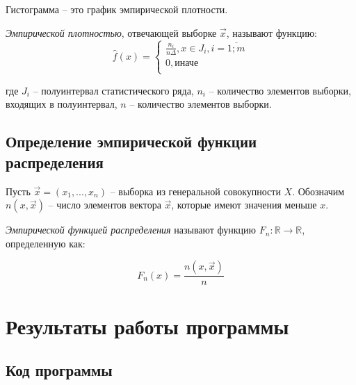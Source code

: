 \documentclass[12pt]{report}
\begin{document}
Гистограмма -- это график эмпирической плотности. 

\textit{Эмпирической плотностью}, отвечающей выборке $\vec x$, называют функцию:
\begin{equation}
	\hat f(x) =
	\begin{cases}
	\frac{n_i}{n \Delta}, x \in J_i, i = \overline{1; m} \\
	0, \text{иначе} \\
	\end{cases}
\end{equation}

где $J_i$ -- полуинтервал статистического ряда, $n_i$ -- количество элементов выборки, входящих в полуинтервал, $n$ -- количество элементов выборки.

\section*{Определение эмпирической функции распределения}

Пусть $\vec x = (x_1, ..., x_n)$ -- выборка из генеральной совокупности $X$. Обозначим $n(x, \vec x)$ -- число элементов вектора $\vec x$, которые имеют значения меньше $x$.

\textit{Эмпирической функцией распределения} называют функцию $F_n: \mathbb{R} \to \mathbb{R}$, определенную как: 

\begin{equation}
	F_n(x) = \frac{n(x, \vec x)}{n}
\end{equation}

\chapter*{Результаты работы программы}

\section*{Код программы}
\end{document}
